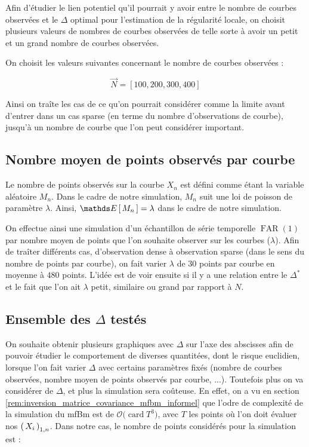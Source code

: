 Afin d'étudier le lien potentiel qu'il pourrait y avoir entre le nombre de courbes observées et le $\Delta$ optimal pour l'estimation de la régularité locale, on choisit plusieurs valeurs de nombres de courbes observées de telle sorte à avoir un \og petit \fg et un \og grand \fg nombre de courbes observées.

On choisit les valeurs suivantes concernant le nombre de courbes observées :

$$
	\vec N = [ 100, 200, 300, 400]
$$

Ainsi on traîte les cas de ce qu'on pourrait considérer comme la limite avant d'entrer dans un cas \og sparse \fg (en terme du nombre d'observations de courbe), jusqu'à un nombre de courbe que l'on peut considérer important.

\subsection{Nombre moyen de points observés par courbe}

Le nombre de points observés sur la courbe $X_n$ est défini comme étant la variable aléatoire $M_n$. Dans le cadre de notre simulation, $M_n$ suit une loi de poisson de paramètre $\lambda$. Ainsi, $\esperance{M_n} = \lambda$ dans le cadre de notre simulation.

On effectue ainsi une simulation d'un échantillon de série temporelle $\operatorname{FAR}(1)$ par nombre moyen de points que l'on souhaite observer sur les courbes ($\lambda$). Afin de traîter différents cas, d'observation \og dense \fg à observation \og sparse \fg (dans le sens du nombre de points par courbe), on fait varier $\lambda$ de $30$ points par courbe en moyenne à $480$ points. L'idée est de voir ensuite si il y a une relation entre le $\Delta^*$ et le fait que l'on ait $\lambda$ petit, similaire ou grand par rapport à $N$.

\subsection{Ensemble des $\Delta$ testés}

On souhaite obtenir plusieurs graphiques avec $\Delta$ sur l'axe des abscisses afin de pouvoir étudier le comportement de diverses quantitées, dont le risque euclidien, lorsque l'on fait varier $\Delta$ avec certains paramètres fixés (nombre de courbes observées, nombre moyen de points observés par courbe, ...). Toutefois plus on va considérer de $\Delta$, et plus la simulation sera coûteuse. En effet, on a vu en section \ref{rem:inversion_matrice_covariance_mfbm_informel} que l'odre de complexité de la simulation du mfBm est de $\mathcal O \bigl( \operatorname{card} T^3 \bigr)$, avec $T$ les points où l'on doit évaluer nos $\left( \, {X} _ {i} \, \right)_{1, n}$. Dans notre cas, le nombre de points considérés pour la simulation est :

